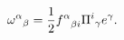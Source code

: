 \begin{equation}{\,\omega^\alpha}_\beta={1\over 2}
{f^{\alpha}}_{\beta i}{\Pi^i}_\gamma e^\gamma.
\label{Tomega}
\end{equation}

